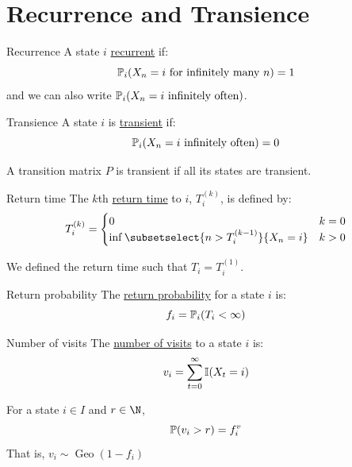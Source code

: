 \documentclass[../Main.tex]{subfiles}
\begin{document}
\section{Recurrence and Transience}
\begin{definition}{Recurrence}
    A state $i$ \underline{recurrent} if:
    \begin{equation*}
        \P_i(X_n = i \text{ for infinitely many } n) = 1
    \end{equation*}
    and we can also write $\P_i(X_n = i \text{ infinitely often})$.
\end{definition}
\begin{definition}{Transience}
    A state $i$ is \underline{transient} if:
    \begin{equation*}
        \P_i(X_n = i \text{ infinitely often}) = 0
    \end{equation*}
\end{definition}
A transition matrix $P$ is transient if all its states are transient.
\begin{definition}{Return time}
    The $k$th \underline{return time} to $i$, $T_i^{(k)}$, is defined by:
    \begin{equation*}
        T_i^{(k)} =
        \begin{cases}
            0 & k = 0 \\
            \inf\subsetselect{n > T_i^{(k-1)}}{X_n = i} & k > 0
        \end{cases}
    \end{equation*}
\end{definition}
We defined the return time such that $T_i = T_i^{(1)}$.
\begin{definition}{Return probability}
    The \underline{return probability} for a state $i$ is:
    \begin{equation*}
        f_i = \P_i(T_i < \infty)
    \end{equation*}
\end{definition}
\begin{definition}{Number of visits}
    The \underline{number of visits} to a state $i$ is:
    \begin{equation*}
        v_i = \sum_{t=0}^{\infty}\ind{X_t = i}
    \end{equation*}
\end{definition}
\begin{lemma}
    For a state $i \in I$ and $r \in \N$,
    \begin{equation*}
        \P(v_i > r) = f_i^v
    \end{equation*}
    That is, $v_i \sim \operatorname{Geo}(1 - f_i)$
    \label{lemVisitsDist}
\end{lemma}
\end{document}
